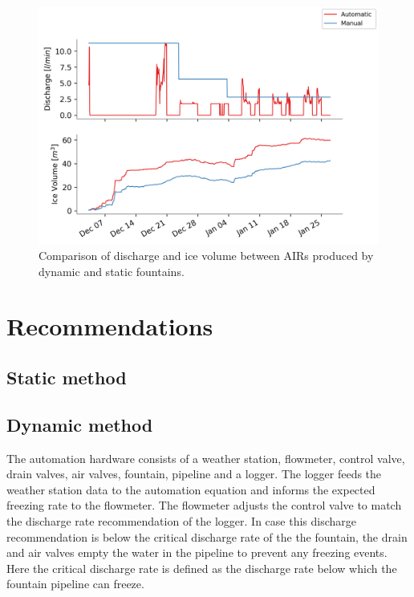 \documentclass[utf8]{frontiersSCNS}
\begin{document}
\begin{figure}[ht]
	\begin{center}
		\includegraphics[width=\linewidth]{Figures/autovsmanual.png}
	\end{center}
	\caption{Comparison of discharge and ice volume between AIRs produced by dynamic and static fountains. }
	\label{fig:old_icestupa}
\end{figure}

\section{Recommendations}
\subsection{Static method}
\subsection{Dynamic method}

The automation hardware consists of a weather station, flowmeter, control valve, drain valves, air valves,
fountain, pipeline and a logger. The logger feeds the weather station data to the automation equation and
informs the expected freezing rate to the flowmeter. The flowmeter adjusts the control valve to match the
discharge rate recommendation of the logger. In case this discharge recommendation is below the critical
discharge rate of the the fountain, the drain and air valves empty the water in the pipeline to prevent any
freezing events. Here the critical discharge rate is defined as the discharge rate below which the fountain
pipeline can freeze.
\end{document}
